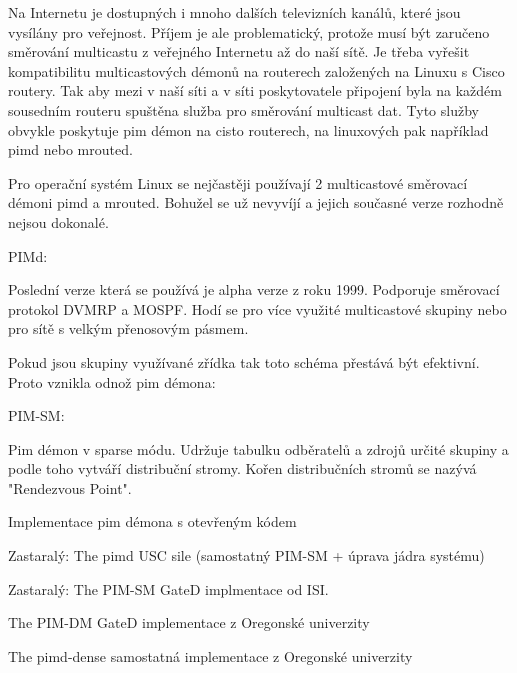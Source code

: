 Na Internetu je dostupných i mnoho dalších televizních kanálů, které jsou vysílány pro veřejnost. Příjem je ale problematický, protože musí být zaručeno směrování multicastu z veřejného Internetu až do naší sítě. Je třeba vyřešit kompatibilitu multicastových démonů na routerech založených na Linuxu s Cisco routery. Tak aby mezi v naší síti a v síti poskytovatele připojení byla na každém sousedním routeru spuštěna služba pro směrování multicast dat. Tyto služby obvykle poskytuje pim démon na cisto routerech, na linuxových pak například pimd nebo mrouted.

\vspace{10pt}

Pro operační systém Linux se nejčastěji používají 2 multicastové směrovací démoni pimd a mrouted. Bohužel se už nevyvíjí a jejich současné verze rozhodně nejsou dokonalé.

\vspace{10pt}

PIMd:

\vspace{5pt}

Poslední verze která se používá je alpha verze z roku 1999. Podporuje směrovací protokol DVMRP a MOSPF. Hodí se pro více využité multicastové skupiny nebo pro sítě s velkým přenosovým pásmem.

\vspace{10pt}

Pokud jsou skupiny využívané zřídka tak toto schéma přestává být efektivní. Proto vznikla odnož pim démona:

\vspace{10pt}

PIM-SM:

\vspace{5pt}

Pim démon v sparse módu. Udržuje tabulku odběratelů a zdrojů určité skupiny a podle toho vytváří distribuční stromy. Kořen distribučních stromů se nazývá "Rendezvous Point".

\vspace{10pt}

Implementace pim démona s otevřeným kódem

Zastaralý: The pimd USC sile (samostatný PIM-SM + úprava jádra systému)

Zastaralý: The PIM-SM GateD implmentace od ISI.

The PIM-DM GateD implementace z Oregonské univerzity

The pimd-dense samostatná implementace z Oregonské univerzity

